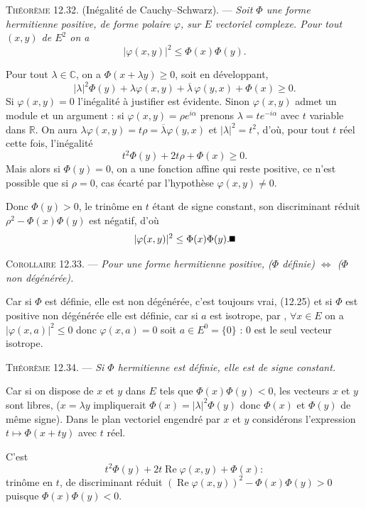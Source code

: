 \medskip\noindent\textsc{Théorème 12.32.} (Inégalité de Cauchy--Schwarz). --- \emph{Soit $\Phi$ une forme hermitienne positive, de forme polaire $\varphi$, sur $E$ vectoriel complexe. Pour tout $(x,y)$ de $E^2$ on a
\[
|\varphi(x,y)|^2\le\Phi(x)\Phi(y).
\]}

Pour tout $\lambda\in\mathbb C$, on a $\Phi(x+\lambda y)\ge0$, soit en développant,
\[
|\lambda|^2\Phi(y)+\lambda\varphi(x,y)+\overline\lambda\,\varphi(y,x)+\Phi(x)\ge0.
\]
Si $\varphi(x,y)=0$ l'inégalité à justifier est évidente. Sinon $\varphi(x,y)$ admet un module et un argument : si $\varphi(x,y)=\rho e^{i\alpha}$ prenons $\lambda=te^{-i\alpha}$ avec $t$ variable dans $\mathbb R$. On aura $\lambda\varphi(x,y)=t\rho=\overline\lambda\varphi(y,x)$ et $|\lambda|^2=t^2$, d'où, pour tout $t$ réel cette fois, l'inégalité
\[
t^2\Phi(y)+2t\rho+\Phi(x)\ge0.
\]
Mais alors si $\Phi(y)=0$, on a une fonction affine qui reste positive, ce n'est possible que si $\rho=0$, cas écarté par l'hypothèse $\varphi(x,y)\ne0$.

Donc $\Phi(y)>0$, le trinôme en $t$ étant de signe constant, son discriminant réduit $\rho^2-\Phi(x)\Phi(y)$ est négatif, d'où
\[
|\varphi(x,y)|^2\le\Phi(x)\Phi(y). \bookend
\]

\medskip\noindent\textsc{Corollaire 12.33.} --- \emph{Pour une forme hermitienne positive, ($\Phi$ définie) $\Longleftrightarrow$ ($\Phi$ non dégénérée).}

Car si $\Phi$ est définie, elle est non dégénérée, c'est toujours vrai, (12.25) et si $\Phi$ est positive non dégénérée elle est définie, car si $a$ est isotrope, par , $\forall x\in E$ on a $|\varphi(x,a)|^2\le0$ donc $\varphi(x,a)=0$ soit $a\in E^0=\{0\}$ : $0$ est le seul vecteur isotrope. \bookend

\medskip\noindent\textsc{Théorème 12.34.} --- \emph{Si $\Phi$ hermitienne est définie, elle est de signe constant.}

Car si on dispose de $x$ et $y$ dans $E$ tels que $\Phi(x)\Phi(y)<0$, les vecteurs $x$ et $y$ sont libres, ($x=\lambda y$ impliquerait $\Phi(x)=|\lambda|^2\Phi(y)$ donc $\Phi(x)$ et $\Phi(y)$ de même signe). Dans le plan vectoriel engendré par $x$ et $y$ considérons l'expression $t\longmapsto\Phi(x+ty)$ avec $t$ réel.

C'est
\[
t^2\Phi(y)+2t\operatorname{Re}\varphi(x,y)+\Phi(x) :
\]
trinôme en $t$, de discriminant réduit $(\operatorname{Re}\varphi(x,y))^2-\Phi(x)\Phi(y)>0$ puisque $\Phi(x)\Phi(y)<0$.

